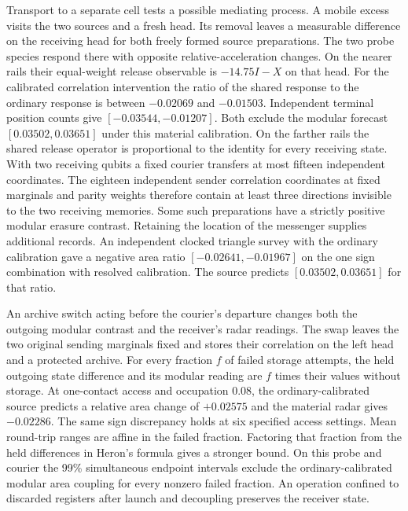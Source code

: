 \documentclass[11pt]{article}
\begin{document}
Transport to a separate cell tests a possible mediating process.
A mobile excess visits the two sources and a fresh head. Its removal
leaves a measurable difference on the receiving head for both freely
formed source preparations. The two probe species respond there with
opposite relative-acceleration changes. On the nearer rails their
equal-weight release observable is $-14.75I-X$ on that head. For the
calibrated correlation intervention the ratio of the shared response to
the ordinary response is between $-0.02069$ and $-0.01503$. Independent
terminal position counts give $[-0.03544,-0.01207]$. Both exclude the
modular forecast $[0.03502,0.03651]$ under this material calibration.
On the farther rails the shared release operator is proportional to the
identity for every receiving state. With two receiving qubits a fixed
courier transfers at most fifteen independent coordinates. The eighteen
independent sender correlation coordinates at fixed marginals and parity
weights therefore contain at least three directions invisible to the two
receiving memories. Some such preparations have a strictly positive
modular erasure contrast. Retaining the location of the messenger supplies
additional records. An independent clocked triangle survey with the
ordinary calibration gave a negative area ratio
$[-0.02641,-0.01967]$ on the one sign combination with resolved
calibration. The source predicts $[0.03502,0.03651]$ for that ratio.


An archive switch acting before the courier's departure changes both the
outgoing modular contrast and the receiver's radar readings. The
swap leaves the two original sending marginals fixed and stores their
correlation on the left head and a protected archive. For every fraction
$f$ of failed storage attempts, the held outgoing state difference and
its modular reading are $f$ times their values without storage. At
one-contact access and occupation 0.08, the ordinary-calibrated source
predicts a relative area change of $+0.02575$ and the material radar
gives $-0.02286$. The same sign discrepancy holds at six specified access settings.
Mean round-trip ranges are affine in the failed fraction. Factoring
that fraction from the held differences in Heron's formula gives
a stronger bound. On this probe and courier the 99\% simultaneous
endpoint intervals exclude the ordinary-calibrated modular area
coupling for every nonzero failed fraction. An operation confined to discarded registers
after launch and decoupling preserves the receiver state.
\end{document}
